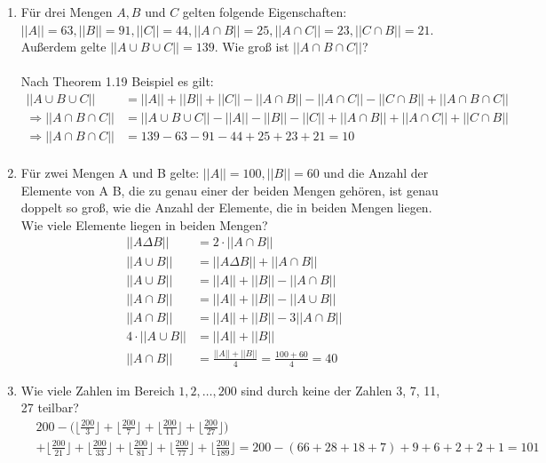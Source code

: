 \begin{enumerate}[label=(\alph*)]
        \item Für drei Mengen $A, B$ und $C$ gelten folgende Eigenschaften: 
        $||A|| = 63, ||B|| = 91, ||C|| = 44, ||A\cap B|| = 25, ||A\cap C|| = 23, ||C \cap B|| = 21$. 
        Außerdem gelte $||A\cup B\cup C|| = 139$. Wie groß ist $||A \cap B \cap C||$?\\\\
        Nach Theorem 1.19 Beispiel es gilt:
        \begin{align*}
	        ||A\cup B\cup C|| &= ||A||+||B||+||C||-||A\cap B||-||A\cap C||-||C \cap B||+||A \cap B \cap C||\\
	        \Rightarrow ||A \cap B \cap C|| &= ||A\cup B\cup C||-||A||-||B||-||C||+||A\cap B||+||A\cap C||+||C \cap B||\\
	        \Rightarrow ||A \cap B \cap C|| &= 139 - 63 - 91 - 44 + 25 + 23 + 21 = 10 \\
        \end{align*}

        \item Für zwei Mengen A und B gelte: $||A|| = 100, ||B|| = 60$ und die Anzahl 
        der Elemente von A  B, die zu genau einer der beiden Mengen gehören, ist genau 
        doppelt so groß, wie die Anzahl der Elemente, die in beiden Mengen liegen. Wie viele Elemente liegen in beiden Mengen?
        \begin{align*}
        	||A \Delta B|| &= 2 \cdot ||A \cap B|| \\
        	||A \cup B || &= ||A \Delta B|| + ||A \cap B|| \\
        	||A \cup B || &= ||A|| + ||B|| - ||A \cap B|| \\
        	||A \cap B || &= ||A|| + ||B|| - ||A \cup B|| \\
        	||A \cap B || &= ||A|| + ||B|| - 3||A \cap B|| \\
        	4 \cdot ||A \cup B || &= ||A|| + ||B|| \\
        	||A \cap B|| &= \frac{||A||+||B||}{4}= \frac{100 + 60}{4} = 40 
        \end{align*}
        
        \item Wie viele Zahlen im Bereich $1, 2,\ldots, 200$ sind durch keine der Zahlen 3, 7, 11, 27 teilbar?\\
        \begin{align*}
	        &200 - \bigg(\bigg\lfloor\frac{200}{3}\bigg\rfloor + \bigg\lfloor\frac{200}{7}\bigg\rfloor
	         + \bigg\lfloor\frac{200}{11}\bigg\rfloor + \bigg\lfloor\frac{200}{27}\bigg\rfloor \bigg) \\
	         &+  \bigg\lfloor\frac{200}{21}\bigg\rfloor + \bigg\lfloor\frac{200}{33}\bigg\rfloor 
	         + \bigg\lfloor\frac{200}{81}\bigg\rfloor + \bigg\lfloor\frac{200}{77}\bigg\rfloor
	         + \bigg\lfloor\frac{200}{189}\bigg\rfloor
	         = 200 - (66+28+18+7) + 9 + 6 + 2 + 2 + 1= 101
        \end{align*}
    \end{enumerate}
